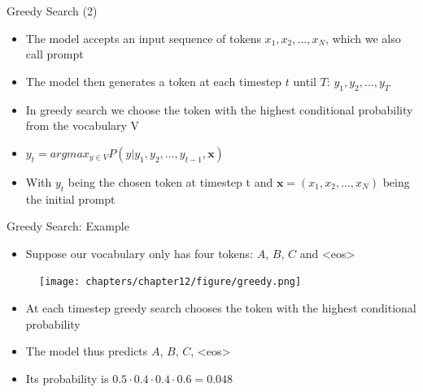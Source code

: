 \begin{vbframe}{Greedy Search (2)}

\vfill

\begin{itemize}
    \item The model accepts an input sequence of tokens $x_1, x_2,...,x_N$, which we also call prompt
    \item The model then generates a token at each timestep $t$ until $T$: $y_1,y_2,...,y_T$
    \item In greedy search we choose the token with the highest conditional probability from the vocabulary V
    \item $y_t = argmax_{y \in V}P(y|y_1,y_2,...,y_{t-1},\mathbf{x})$
    \item With $y_t$ being the chosen token at timestep t and $\mathbf{x} = (x_1, x_2,...,x_N)$ being the initial prompt
\end{itemize}

\vfill

\end{vbframe}


\begin{vbframe}{Greedy Search: Example}
\href{https://d2l.ai/chapter_recurrent-modern/beam-search.html}{}

\begin{itemize}
    \item Suppose our vocabulary only has four tokens: $A$, $B$, $C$ and <eos>
\end{itemize}

\begin{figure}
    \centering
    \texttt{[image: chapters/chapter12/figure/greedy.png]}
\end{figure}

\begin{itemize}
    \item At each timestep greedy search chooses the token with the highest conditional probability
    \item The model thus predicts $A$, $B$, $C$, <eos>
    \item Its probability is $0.5\cdot 0.4 \cdot 0.4 \cdot 0.6 = 0.048$
\end{itemize}

\end{vbframe}


